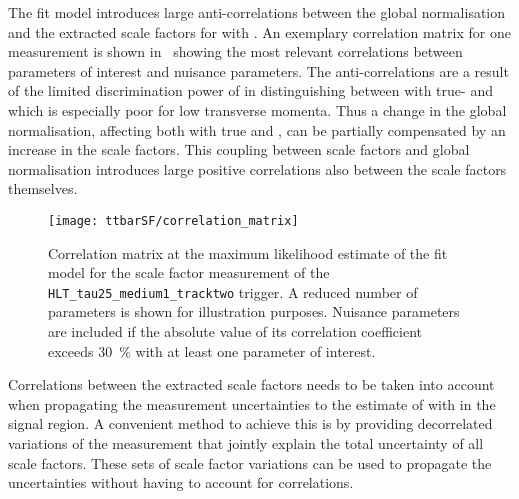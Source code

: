 

The fit model introduces large anti-correlations between the global
\ttbar normalisation and the extracted scale factors for \ttbar with
\faketauhadvis. An exemplary correlation matrix for one measurement is
shown in~ showing the most relevant
correlations between parameters of interest and nuisance parameters.
The anti-correlations are a result of the limited discrimination power
of \mTW in distinguishing between \ttbar with true- and \faketauhadvis
which is especially poor for low \tauhadvis transverse momenta. Thus a
change in the global \ttbar normalisation, affecting both \ttbar with
true and \faketauhadvis, can be partially compensated by an increase
in the \faketauhadvis scale factors. This coupling between scale
factors and global \ttbar normalisation introduces large positive
correlations also between the scale factors themselves.

\begin{figure}[htbp]
  \centering
  \texttt{[image: ttbarSF/correlation\_matrix]}

  \caption{Correlation matrix at the maximum likelihood estimate of
    the fit model for the scale factor measurement of the
    \texttt{HLT\_tau25\_medium1\_tracktwo} trigger. A reduced number
    of parameters is shown for illustration purposes. Nuisance
    parameters are included if the absolute value of its correlation
    coefficient exceeds \SI{30}{\percent} with at least one parameter
    of interest.}
  \label{fig:ttbarSF_corr_matrix}
\end{figure}

Correlations between the extracted scale factors needs to be taken
into account when propagating the measurement uncertainties to the
estimate of \ttbar with \faketauhadvis in the \hadhad signal region. A
convenient method to achieve this is by providing decorrelated
variations of the measurement that jointly explain the total
uncertainty of all scale factors. These sets of scale factor
variations can be used to propagate the uncertainties without having
to account for correlations.

